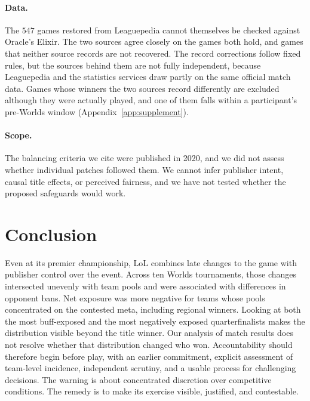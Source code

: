 \documentclass[11pt]{article}
\begin{document}
\paragraph{Data.} The $547$ games restored from Leaguepedia cannot themselves be checked against Oracle's Elixir. The two sources agree closely on the games both hold, and games that neither source records are not recovered. The record corrections follow fixed rules, but the sources behind them are not fully independent, because Leaguepedia and the statistics services draw partly on the same official match data. Games whose winners the two sources record differently are excluded although they were actually played, and one of them falls within a participant's pre-Worlds window (Appendix~\ref{app:supplement}).

\paragraph{Scope.} The balancing criteria we cite were published in 2020, and we did not assess whether individual patches followed them. We cannot infer publisher intent, causal title effects, or perceived fairness, and we have not tested whether the proposed safeguards would work.

\section{Conclusion}
Even at its premier championship, LoL combines late changes to the game with publisher control over the event. Across ten Worlds tournaments, those changes intersected unevenly with team pools and were associated with differences in opponent bans. Net exposure was more negative for teams whose pools concentrated on the contested meta, including regional winners. Looking at both the most buff-exposed and the most negatively exposed quarterfinalists makes the distribution visible beyond the title winner. Our analysis of match results does not resolve whether that distribution changed who won. Accountability should therefore begin before play, with an earlier commitment, explicit assessment of team-level incidence, independent scrutiny, and a usable process for challenging decisions. The warning is about concentrated discretion over competitive conditions. The remedy is to make its exercise visible, justified, and contestable.
\end{document}
